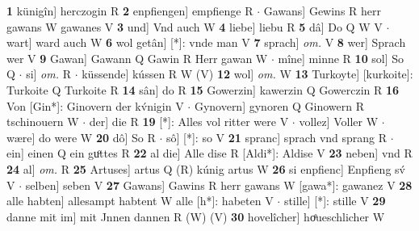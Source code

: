 \documentclass[8pt,a4paper,notitlepage]{article}
\begin{document}
\begin{table}[ht]
\begin{minipage}[t]{0.5\linewidth}
\textbf{1} künigîn] herczogin R \textbf{2} enpfiengen] empfienge R  $\cdot$ Gawans] Gewins R herr gawans W gawanes V \textbf{3} und] Vnd auch W \textbf{4} liebe] liebu R \textbf{5} dâ] Do Q W V  $\cdot$ wart] ward auch W \textbf{6} wol getân] [*]: vnde man V \textbf{7} sprach] \textit{om.} V \textbf{8} wer] Sprach wer V \textbf{9} Gawan] Gawann Q Gawin R Herr gawan W  $\cdot$ mîne] minne R \textbf{10} sol] So Q  $\cdot$ si] \textit{om.} R  $\cdot$ küssende] kússen R W (V) \textbf{12} wol] \textit{om.} W \textbf{13} Turkoyte] [kurkoite]: Turkoite Q Turkoite R \textbf{14} sân] do R \textbf{15} Gowerzin] kawerzin Q Gowerczin R \textbf{16} Von [Gin*]: Ginovern der kv́nigin V  $\cdot$ Gynovern] gynoren Q Ginowern R tschinouern W  $\cdot$ der] die R \textbf{19} [*]: Alles vol ritter were V  $\cdot$ vollez] Voller W  $\cdot$ wære] do were W \textbf{20} dô] So R  $\cdot$ sô] [*]: so V \textbf{21} spranc] sprach vnd sprang R  $\cdot$ ein] einen Q ein guͦttes R \textbf{22} al die] Alle dise R [Aldi*]: Aldise V \textbf{23} neben] vnd R \textbf{24} al] \textit{om.} R \textbf{25} Artuses] artus Q (R) kúnig artus W \textbf{26} si enpfienc] Enpfieng sv́ V  $\cdot$ selben] seben V \textbf{27} Gawans] Gawins R herr gawans W [gawa*]: gawanez V \textbf{28} alle habten] allesampt habtent W alle [h*]: habeten V  $\cdot$ stille] [*]: stille V \textbf{29} danne mit im] mit Jnnen dannen R (W) (V) \textbf{30} hovelîcher] hoͤueschlicher W \newline
\end{minipage}
\end{table}
\end{document}
